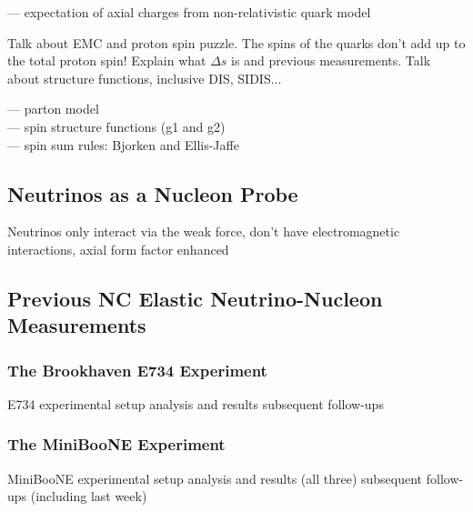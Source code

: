   --- expectation of axial charges from non-relativistic quark model

  Talk about EMC and proton spin puzzle. The spins of the quarks don't add up
  to the total proton spin! Explain what $\Delta s$ is and previous
  measurements. Talk about structure functions, inclusive DIS, SIDIS...

  --- parton model \\
  --- spin structure functions (g1 and g2) \\
  --- spin sum rules: Bjorken and Ellis-Jaffe \\


\subsection{Neutrinos as a Nucleon Probe}\label{sec:neutrinos}

  Neutrinos only interact via the weak force, don't have electromagnetic
  interactions, axial form factor enhanced

  \subsection{Previous NC Elastic Neutrino-Nucleon Measurements}
  \label{sec:measurements}

    \subsubsection{The Brookhaven E734 Experiment}\label{sec:e734}
    E734 experimental setup
    analysis and results
    subsequent follow-ups

    \subsubsection{The MiniBooNE Experiment}\label{sec:miniboonence}
    MiniBooNE experimental setup
    analysis and results (all three)
    subsequent follow-ups (including last week)


